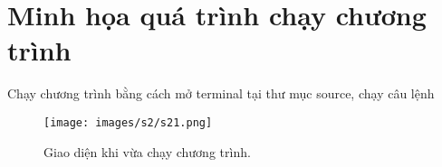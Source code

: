\section{Minh họa quá trình chạy chương trình}
Chạy chương trình bằng cách mở terminal tại thư mục source, chạy câu lệnh 
\begin{figure}[H]
        \centering
        \texttt{[image: images/s2/s21.png]} 
        \caption{Giao diện khi vừa chạy chương trình.}
        \label{figure:s1}
\end{figure}
